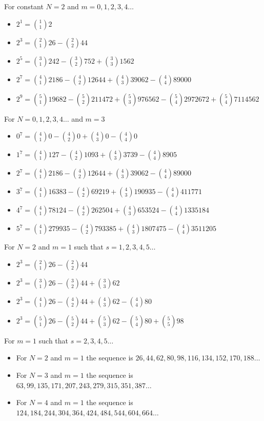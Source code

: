 For constant $N=2$ and $m=0,1,2,3,4\dots$
\begin{itemize}
    \item $2^1 = \binom{1}{1} 2$
    \item $2^3 = \binom{2}{1} 26 - \binom{2}{2} 44$
    \item $2^5 = \binom{3}{1} 242 - \binom{3}{2} 752 + \binom{3}{3} 1562$
    \item $2^7 = \binom{4}{1} 2186 - \binom{4}{2} 12644 + \binom{4}{3} 39062 - \binom{4}{4} 89000$
    \item $2^9 = \binom{5}{1} 19682 - \binom{5}{2} 211472 + \binom{5}{3} 976562 - \binom{5}{4} 2972672 + \binom{5}{4} 7114562$
\end{itemize}
For $N=0,1,2,3,4\dots$ and $m=3$
\begin{itemize}
    \item $0^7 = \binom{4}{1} 0 - \binom{4}{2} 0 + \binom{4}{3} 0 - \binom{4}{4} 0$
    \item $1^7 = \binom{4}{1} 127 - \binom{4}{2} 1093 + \binom{4}{3} 3739 - \binom{4}{4} 8905$
    \item $2^7 = \binom{4}{1} 2186 - \binom{4}{2} 12644 + \binom{4}{3} 39062 - \binom{4}{4} 89000$
    \item $3^7 = \binom{4}{1} 16383 - \binom{4}{2} 69219 + \binom{4}{3} 190935 - \binom{4}{4} 411771$
    \item $4^7 = \binom{4}{1} 78124 - \binom{4}{2} 262504 + \binom{4}{3} 653524 - \binom{4}{4} 1335184$
    \item $5^7 = \binom{4}{1} 279935 - \binom{4}{2} 793385 + \binom{4}{3} 1807475 - \binom{4}{4} 3511205$
\end{itemize}
For $N=2$ and $m=1$ such that $s=1,2,3,4,5\dots$
\begin{itemize}
    \item $2^3 = \binom{2}{1} 26 - \binom{2}{2} 44$
    \item $2^3 = \binom{3}{1} 26 - \binom{3}{2} 44 + \binom{3}{3} 62$
    \item $2^3 = \binom{4}{1} 26 - \binom{4}{2} 44 + \binom{4}{3} 62 - \binom{4}{4} 80$
    \item $2^3 = \binom{5}{1} 26 - \binom{5}{2} 44 + \binom{5}{3} 62 - \binom{5}{4} 80 + \binom{5}{5} 98$
\end{itemize}
For $m=1$ such that $s=2,3,4,5\dots$
\begin{itemize}
    \item For $N=2$ and $m=1$ the sequence is $26, 44, 62, 80, 98, 116, 134, 152, 170, 188 \dots$
    \item For $N=3$ and $m=1$ the sequence is $63, 99, 135, 171, 207, 243, 279, 315, 351, 387 \dots$
    \item For $N=4$ and $m=1$ the sequence is $124, 184, 244, 304, 364, 424, 484, 544, 604, 664 \dots$
\end{itemize}

